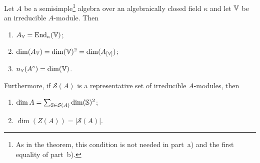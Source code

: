 \begin{cor}\label{cor:alg-closed-dim-equations}
    Let\/ $A$ be a semisimple\footnote{As in the theorem, this condition is not needed in part~a) and the first equality of part~b).} algebra over an algebraically closed field\/ $\kappa$ and let\/ $\mathbb V$ be an irreducible\/ $A$-module. Then
    \begin{enumerate}[\rm a)]
        \item $A_\mathbb V = {\operatorname{End}}_\kappa(\mathbb V)$;
        \item $\dim(A_\mathbb V) = \dim(\mathbb V)^2 = \dim(A_{[\mathbb V]})$;
        \item $n_\mathbb V(A^\circ) = \dim(\mathbb V)$.
    \end{enumerate}
    Furthermore, if\/ $\mathcal S(A)$ is a representative set of irreducible\/ $A$-modules, then
    \begin{enumerate}[\rm a),start=4]
        \item $\dim A = \sum_{\mathbb S \in\mathcal S(A)} \dim(\mathbb S)^2$;
        \item $\dim(Z(A)) = |\mathcal S(A)|$.
    \end{enumerate}
\end{cor}

